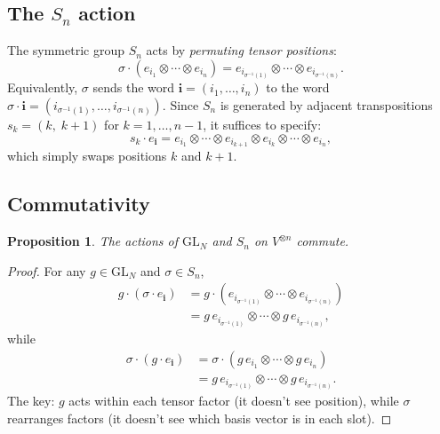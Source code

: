 \documentclass[12pt,a4paper]{article}
\newtheorem{proposition}[theorem]{Proposition}
\theoremstyle{definition}
\theoremstyle{remark}
\begin{document}
\subsection{The $S_n$ action}

The symmetric group $S_n$ acts by \emph{permuting tensor positions}:
\begin{equation}\label{eq:Sn-action}
  \sigma \cdot (e_{i_1} \otimes \cdots \otimes e_{i_n})
  = e_{i_{\sigma^{-1}(1)}} \otimes \cdots \otimes e_{i_{\sigma^{-1}(n)}}.
\end{equation}
Equivalently, $\sigma$ sends the word $\mathbf{i} = (i_1, \ldots, i_n)$
to the word $\sigma \cdot \mathbf{i} = (i_{\sigma^{-1}(1)}, \ldots, i_{\sigma^{-1}(n)})$.
Since $S_n$ is generated by adjacent transpositions $s_k = (k,\; k{+}1)$
for $k = 1, \ldots, n{-}1$, it suffices to specify:
\[
  s_k \cdot e_\mathbf{i}
  = e_{i_1} \otimes \cdots \otimes e_{i_{k+1}} \otimes e_{i_k}
    \otimes \cdots \otimes e_{i_n},
\]
which simply swaps positions $k$ and $k{+}1$.

\subsection{Commutativity}

\begin{proposition}\label{prop:commute}
The actions of $\mathrm{GL}_N$ and $S_n$ on $V^{\otimes n}$ commute.
\end{proposition}

\begin{proof}
For any $g \in \mathrm{GL}_N$ and $\sigma \in S_n$,
\begin{align*}
  g \cdot (\sigma \cdot e_\mathbf{i})
  &= g \cdot (e_{i_{\sigma^{-1}(1)}} \otimes \cdots
       \otimes e_{i_{\sigma^{-1}(n)}}) \\
  &= g\,e_{i_{\sigma^{-1}(1)}} \otimes \cdots
       \otimes g\,e_{i_{\sigma^{-1}(n)}},
\end{align*}
while
\begin{align*}
  \sigma \cdot (g \cdot e_\mathbf{i})
  &= \sigma \cdot (g\,e_{i_1} \otimes \cdots \otimes g\,e_{i_n}) \\
  &= g\,e_{i_{\sigma^{-1}(1)}} \otimes \cdots
       \otimes g\,e_{i_{\sigma^{-1}(n)}}.
\end{align*}
The key: $g$ acts within each tensor factor (it doesn't see position),
while $\sigma$ rearranges factors (it doesn't see which basis vector
is in each slot).
\end{proof}
\end{document}

